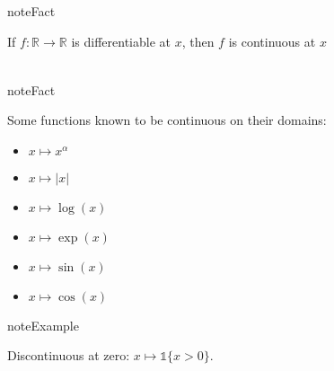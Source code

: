 \documentclass[letterpaper,10pt,english]{jupyterBook}
\begin{document}
\begin{sphinxadmonition}{note}{Fact}

\sphinxAtStartPar
If \(f \colon \mathbb{R} \to \mathbb{R}\) is differentiable at \(x\), then \(f\) is continuous at \(x\)
\end{sphinxadmonition}
\begin{equation*}
\begin{split}
\end{split}
\end{equation*}
\begin{sphinxadmonition}{note}{Fact}

\sphinxAtStartPar
Some functions known to be continuous on their domains:
\begin{itemize}
\item {} 
\sphinxAtStartPar
\(x \mapsto x^\alpha\)

\item {} 
\sphinxAtStartPar
\(x \mapsto |x|\)

\item {} 
\sphinxAtStartPar
\(x \mapsto \log(x)\)

\item {} 
\sphinxAtStartPar
\(x \mapsto \exp(x)\)

\item {} 
\sphinxAtStartPar
\(x \mapsto \sin(x)\)

\item {} 
\sphinxAtStartPar
\(x \mapsto \cos(x)\)

\end{itemize}
\end{sphinxadmonition}

\begin{sphinxadmonition}{note}{Example}

\sphinxAtStartPar
Discontinuous at zero: \(x \mapsto \mathbb{1}\{x > 0\}\).
\end{sphinxadmonition}
\end{document}
